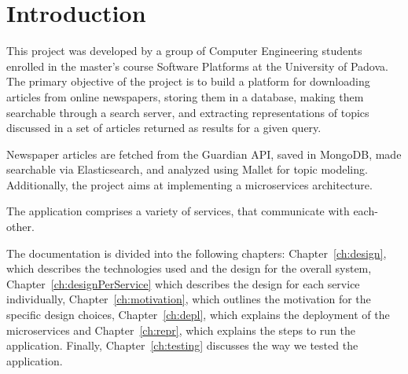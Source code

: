 \section{Introduction}
\label{ch:in}
This project was developed by a group of Computer Engineering students enrolled in the master's
course Software Platforms at the University of Padova. The primary objective of the project is
to build a platform for downloading articles from online newspapers, storing them in a database,
making them searchable through a search server, and extracting representations of topics discussed
in a set of articles returned as results for a given query.

Newspaper articles are fetched from the Guardian API, saved in MongoDB, made searchable via
Elasticsearch, and analyzed using Mallet for topic modeling.
Additionally, the project aims at
implementing a microservices architecture.

The application comprises a variety of services, that communicate with each-other.


The documentation is divided into the following chapters: Chapter~\ref{ch:design},
which describes the technologies used and the design for the overall system, Chapter~\ref{ch:designPerService} which describes the design
 for each service individually, Chapter~\ref{ch:motivation}, which outlines the motivation
 for the specific design choices, Chapter~\ref{ch:depl}, which explains the deployment
 of the microservices and Chapter~\ref{ch:repr},
 which explains the steps to run the application. Finally, Chapter~\ref{ch:testing}
 discusses the way we tested the application.
